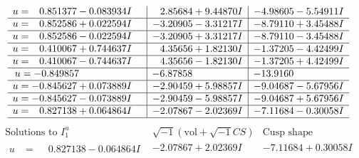 \documentclass[1p]{elsarticle_modified}
\theoremstyle{definition}
\newcommand{\I}{\sqrt{-1}}
\begin{document}
$$\begin{array}{c|c|c}
\begin{aligned}
u &= \phantom{-}0.851377 - 0.083934 I\end{aligned}
 & \phantom{-}2.85684 + 9.44870 I & -4.98605 - 5.54911 I \\ \hline\begin{aligned}
u &= \phantom{-}0.852586 + 0.022594 I\end{aligned}
 & -3.20905 - 3.31217 I & -8.79110 + 3.45488 I \\ \hline\begin{aligned}
u &= \phantom{-}0.852586 - 0.022594 I\end{aligned}
 & -3.20905 + 3.31217 I & -8.79110 - 3.45488 I \\ \hline\begin{aligned}
u &= \phantom{-}0.410067 + 0.744637 I\end{aligned}
 & \phantom{-}4.35656 + 1.82130 I & -1.37205 - 4.42499 I \\ \hline\begin{aligned}
u &= \phantom{-}0.410067 - 0.744637 I\end{aligned}
 & \phantom{-}4.35656 - 1.82130 I & -1.37205 + 4.42499 I \\ \hline\begin{aligned}
u &= -0.849857\phantom{ +0.000000I}\end{aligned}
 & -6.87858\phantom{ +0.000000I} & -13.9160\phantom{ +0.000000I} \\ \hline\begin{aligned}
u &= -0.845627 + 0.073889 I\end{aligned}
 & -2.90459 + 5.98857 I & -9.04687 - 5.67956 I \\ \hline\begin{aligned}
u &= -0.845627 - 0.073889 I\end{aligned}
 & -2.90459 - 5.98857 I & -9.04687 + 5.67956 I \\ \hline\begin{aligned}
u &= \phantom{-}0.827138 + 0.064864 I\end{aligned}
 & -2.07867 - 2.02369 I & -7.11684 - 0.30058 I\\
 \hline 
 \end{array}$$\newpage$$\begin{array}{c|c|c}  
\text{Solutions to }I^u_{1}& \I (\text{vol} + \sqrt{-1}CS) & \text{Cusp shape}\\
 \hline 
\begin{aligned}
u &= \phantom{-}0.827138 - 0.064864 I\end{aligned}
 & -2.07867 + 2.02369 I & -7.11684 + 0.30058 I \\ \hline\begin{aligned}

\end{aligned}
\end{array}$$
\end{document}
